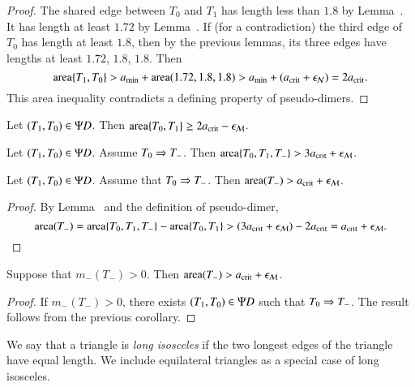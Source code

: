 \begin{proof}
  The shared edge between $T_0$ and $T_1$ has length less than $1.8$
  by Lemma~.  It has length at least $1.72$ by
  Lemma~.  If (for a contradiction) the third edge of
  $T_0$ has length at least $1.8$, then by the previous lemmas, its
  three edges have lengths at least $1.72$, $1.8$, $1.8$.  Then
\[
{\operatorname{area}}\{T_1,T_0\} > a_\text{min} + {\operatorname{area}}(1.72,1.8,1.8) 
> a_\text{min} + (a_\text{crit} + \epsilon_{\mathcal N}) = 2a_\text{crit}.
\]
This area inequality contradicts a defining property of pseudo-dimers.
\end{proof}

\begin{lemma}
Let $(T_1,T_0)\in\Psi D$.  Then ${\operatorname{area}}\{T_0,T_1\} \ge 2a_\text{crit} - \epsilon_{\mathcal M}$.
\end{lemma}

\begin{lemma}
Let $(T_1,T_0)\in\Psi D$. Assume $T_0\Rightarrow T_-$.  
Then ${\operatorname{area}}\{T_0,T_1,T_-\} > 3a_\text{crit} + \epsilon_{\mathcal M}$.
\end{lemma}

\begin{corollary} 
Let $(T_1,T_0)\in\Psi D$.  Assume that $T_0\Rightarrow T_-$.  Then
${\operatorname{area}}(T_-) > a_\text{crit}+\epsilon_{\mathcal M}$.
\end{corollary}

\begin{proof}  
  By Lemma~ and the definition of pseudo-dimer,
\[
{\operatorname{area}}(T_-) = {\operatorname{area}}\{T_0,T_1,T_-\} - {\operatorname{area}}\{T_0,T_1\} 
> (3a_\text{crit} + \epsilon_{\mathcal M}) - 2a_\text{crit} = a_\text{crit} + \epsilon_{\mathcal M}.
\]
\end{proof}

\begin{corollary}
  Suppose that $m_-(T_-)>0$.  Then ${\operatorname{area}}(T_-) > a_\text{crit} + \epsilon_{\mathcal M}$.
\end{corollary}

\begin{proof} 
  If $m_-(T_-)>0$, there exists $(T_1,T_0)\in\Psi D$ such that $T_0\Rightarrow
  T_-$.  The result follows from the previous corollary.
\end{proof}


\begin{definition}
  We say that a triangle is {\it long isosceles} if the two longest edges of
  the triangle have equal length.  We include equilateral triangles as
  a special case of long isosceles.
\end{definition}

